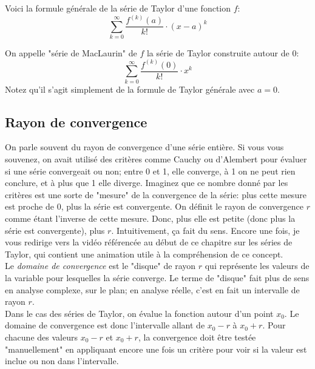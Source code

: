 \documentclass{article}
\begin{document}
Voici la formule générale de la série de Taylor d'une fonction \(f\):
\begin{equation}
	\boxed{ \sum_{k=0}^\infty \dfrac{f^{(k)}(a)}{k!} \cdot (x-a)^k }
\end{equation}

On appelle "série de MacLaurin" de \(f\) la série de Taylor construite autour de 0:
\begin{equation}
	\boxed{ \sum_{k=0}^\infty \dfrac{f^{(k)}(0)}{k!} \cdot x^k }
\end{equation}
Notez qu'il s'agit simplement de la formule de Taylor générale avec \(a = 0\).

\subsection{Rayon de convergence}
On parle souvent du rayon de convergence d'une série entière. Si vous vous souvenez, on avait utilisé des critères comme Cauchy ou d'Alembert pour évaluer si une série convergeait ou non; entre 0 et 1, elle converge, à 1 on ne peut rien conclure, et à plus que 1 elle diverge. Imaginez que ce nombre donné par les critères est une sorte de "mesure" de la convergence de la série: plus cette mesure est proche de 0, plus la série est convergente. On définit le rayon de convergence \(r\) comme étant l'inverse de cette mesure. Donc, plus elle est petite (donc plus la série est convergente), plus \(r\). Intuitivement, ça fait du sens. Encore une fois, je vous redirige vers la vidéo référencée au début de ce chapitre sur les séries de Taylor, qui contient une animation utile à la compréhension de ce concept. \\

Le \emph{domaine de convergence} est le "disque" de rayon \(r\) qui représente les valeurs de la variable pour lesquelles la série converge. Le terme de "disque" fait plus de sens en analyse complexe, sur le plan; en analyse réelle, c'est en fait un intervalle de rayon \(r\). \\

Dans le cas des séries de Taylor, on évalue la fonction autour d'un point \(x_0\). Le domaine de convergence est donc l'intervalle allant de \(x_0-r\) à \(x_0+r\). Pour chacune des valeurs \(x_0-r\) et \(x_0+r\), la convergence doit être testée "manuellement" en appliquant encore une fois un critère pour voir si la valeur est inclue ou non dans l'intervalle.

\end{document}
